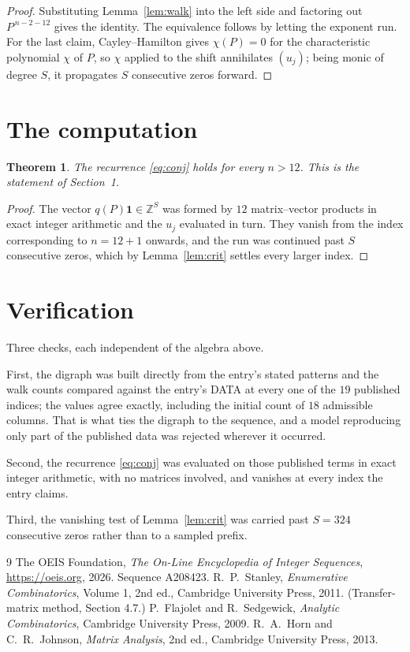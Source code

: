 \documentclass[11pt,a4paper]{article}
\theoremstyle{plain}
\newtheorem{theorem}{Theorem}
\theoremstyle{definition}
\begin{document}
\begin{proof}
Substituting Lemma~\ref{lem:walk} into the left side and factoring out
$P^{\,n-2-12}$ gives the identity. The equivalence follows by letting the exponent
run. For the last claim, Cayley--Hamilton gives $\chi(P)=0$ for the characteristic
polynomial $\chi$ of $P$, so $\chi$ applied to the shift annihilates $(u_j)$; being monic of
degree $S$, it propagates $S$ consecutive zeros forward.
\end{proof}

\section{The computation}

\begin{theorem}
The recurrence \eqref{eq:conj} holds for every $n>12$. This is the statement of
Section~1.
\end{theorem}

\begin{proof}
The vector $q(P)\mathbf{1}\in\mathbb{Z}^{S}$ was formed by $12$ matrix--vector
products in exact integer arithmetic and the $u_j$ evaluated in turn. They vanish from the
index corresponding to $n=12+1$ onwards, and the run was continued past $S$ consecutive
zeros, which by Lemma~\ref{lem:crit} settles every larger index.
\end{proof}

\section{Verification}

Three checks, each independent of the algebra above.

First, the digraph was built directly from the entry's stated patterns and the walk counts
compared against the entry's DATA at every one of the $19$ published indices; the
values agree exactly, including the initial count of $18$ admissible columns. That is
what ties the digraph to the sequence, and a model reproducing only part of the published
data was rejected wherever it occurred.

Second, the recurrence \eqref{eq:conj} was evaluated on those published terms in exact
integer arithmetic, with no matrices involved, and vanishes at every index the entry claims.

Third, the vanishing test of Lemma~\ref{lem:crit} was carried past $S=324$ consecutive
zeros rather than to a sampled prefix.

\begin{thebibliography}{9}
 The OEIS Foundation, \emph{The On-Line Encyclopedia of Integer
Sequences}, \url{https://oeis.org}, 2026. Sequence A208423.
 R.~P.~Stanley, \emph{Enumerative Combinatorics}, Volume 1, 2nd ed.,
Cambridge University Press, 2011. (Transfer-matrix method, Section 4.7.)
 P.~Flajolet and R.~Sedgewick, \emph{Analytic Combinatorics}, Cambridge
University Press, 2009.
 R.~A.~Horn and C.~R.~Johnson, \emph{Matrix Analysis}, 2nd ed., Cambridge
University Press, 2013.
\end{thebibliography}
\end{document}
